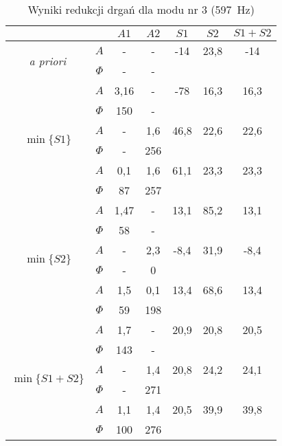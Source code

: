 \documentclass[polish,a4paper,11pt]{mwart}
\begin{document}
  \begin{table}[!tbh]
    \centering
    \caption{Wyniki redukcji drgań dla modu nr 3 (\SI{597}{\hertz})}
    \label{tab:red3}
    \begin{tabular}{|c|c|c|c|c|c|c|}
      \cline{3-7}
      \multicolumn{2}{c|}{}&$A1$&$A2$&$S1$&$S2$&$S1+S2$\\\hline
      \multirow{2}{*}{\textit{a priori}} & $A$ & - & - & -14 & 23,8 & -14\\\cline{2-7}
					 & $\Phi$ & - & - & \multicolumn{3}{c}{}\\\hline
      \multirow{6}{*}{$\min\{S1\}$}   &   $A$ & 3,16 & - & -78 & 16,3 & 16,3\\\cline{2-7}
				      &$\Phi$ & 150 & - & \multicolumn{3}{c}{}\\\cline{2-7}
				      &   $A$ & - & 1,6 & 46,8 & 22,6 & 22,6\\\cline{2-7}
				      &$\Phi$ & - & 256 & \multicolumn{3}{c}{}\\\cline{2-7}
				      &   $A$ & 0,1 & 1,6 & 61,1 & 23,3 & 23,3\\\cline{2-7}
				      &$\Phi$ & 87 & 257 & \multicolumn{3}{c}{}\\\hline
      \multirow{6}{*}{$\min\{S2\}$}   &   $A$ & 1,47 & - & 13,1 & 85,2 & 13,1\\\cline{2-7}
				      &$\Phi$ & 58 & - & \multicolumn{3}{c}{}\\\cline{2-7}
				      &   $A$ & - & 2,3 & -8,4 & 31,9 & -8,4\\\cline{2-7}
				      &$\Phi$ & - & 0 & \multicolumn{3}{c}{}\\\cline{2-7}
				      &   $A$ & 1,5 & 0,1 & 13,4 & 68,6 & 13,4\\\cline{2-7}
				      &$\Phi$ & 59 & 198 & \multicolumn{3}{c}{}\\\hline
      \multirow{6}{*}{$\min\{S1+S2\}$}&   $A$ & 1,7 & - & 20,9 & 20,8 & 20,5\\\cline{2-7}
				      &$\Phi$ & 143 & - & \multicolumn{3}{c}{}\\\cline{2-7}
				      &   $A$ & - & 1,4 & 20,8 & 24,2 & 24,1\\\cline{2-7}
				      &$\Phi$ & - & 271 & \multicolumn{3}{c}{}\\\cline{2-7}
				      &   $A$ & 1,1 & 1,4 & 20,5 & 39,9 & 39,8\\\cline{2-7}
				      &$\Phi$ & 100 & 276 & \multicolumn{3}{c}{}\\\cline{1-4}
    \end{tabular}
  \end{table}
\end{document}
